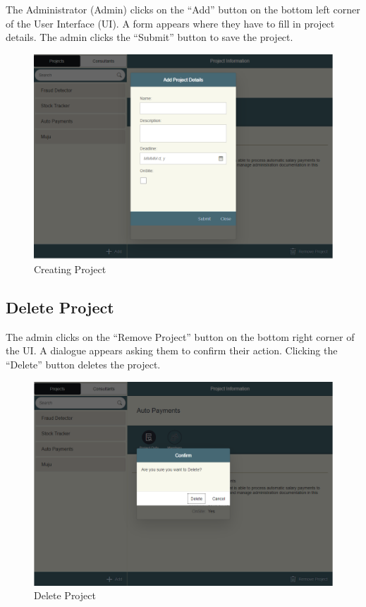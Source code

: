 \documentclass[a4paper, 12pt, oneside]{article}
\begin{document}
The Administrator (Admin) clicks on the “Add” button on the bottom left corner of the User Interface (UI). A form appears where they have to fill in project details. The admin clicks the “Submit” button to save the project.

\begin{figure}[h]

\centering

\includegraphics[width=\linewidth]{images/createProject.PNG}

\caption{Creating Project}

\label{fig:sfig1}

\end{figure}


\subsection{Delete Project}

The admin clicks on the “Remove Project” button on the  bottom right corner of the UI. A dialogue appears asking them to confirm their action. Clicking the “Delete” button deletes the project.

\begin{figure}[h]

\centering

\includegraphics[width=\linewidth]{images/deleteProject.PNG}

\caption{Delete Project}

\label{fig:sfig1}

\end{figure}
\end{document}
